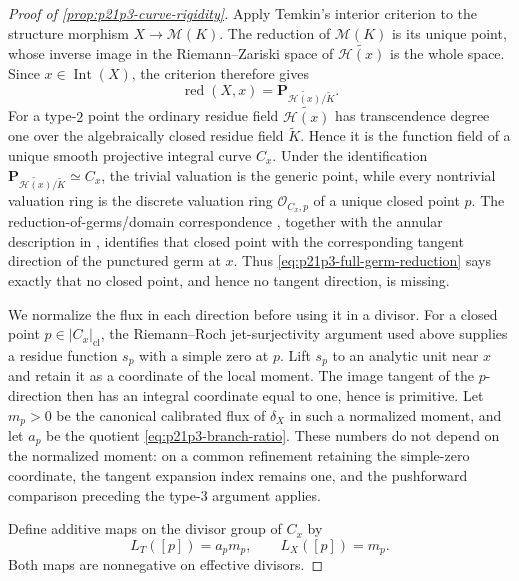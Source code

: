 \begin{proof}[Proof of \cref{prop:p21p3-curve-rigidity}]
Apply Temkin's interior criterion
\cite[Theorem~6.15]{GJR26} to the structure morphism
\(X\to\mathcal M(K)\).  The reduction of \(\mathcal M(K)\) is its
unique point, whose inverse image in the Riemann--Zariski space of
\(\widetilde{\mathcal H(x)}\) is the whole space.  Since
\(x\in\operatorname{Int}(X)\), the criterion therefore gives
\begin{equation}
\label{eq:p21p3-full-germ-reduction}
 \operatorname{red}(X,x)
   =\mathbf P_{\widetilde{\mathcal H(x)}/\widetilde K}.
\end{equation}
For a type-$2$ point the ordinary residue field
\(\widetilde{\mathcal H(x)}\) has transcendence degree one over the
algebraically closed residue field \(\widetilde K\).  Hence it is the
function field of a unique smooth projective integral curve \(C_x\).
Under the identification
\(
 \mathbf P_{\widetilde{\mathcal H(x)}/\widetilde K}\simeq C_x
\), the trivial valuation is the generic point, while every nontrivial
valuation ring is the discrete valuation ring
\(\mathcal O_{C_x,p}\) of a unique closed point \(p\).  The
reduction-of-germs/domain correspondence
\cite[\S11.8.6]{CLD25}, together with the annular description in
\cite[\S\S18.2.5--18.2.8]{CLD25}, identifies that closed point with the
corresponding tangent direction of the punctured germ at \(x\).  Thus
\eqref{eq:p21p3-full-germ-reduction} says exactly that no closed point,
and hence no tangent direction, is missing.

We normalize the flux in each direction before using it in a divisor.
For a closed point \(p\in |C_x|_{\mathrm{cl}}\), the Riemann--Roch
jet-surjectivity argument used above supplies a residue function \(s_p\)
with a simple zero at \(p\).  Lift \(s_p\) to an analytic unit near \(x\)
and retain it as a coordinate of the local moment.  The image tangent of
the \(p\)-direction then has an integral coordinate equal to one, hence is
primitive.  Let \(m_p>0\) be the canonical calibrated flux of
\(\delta_X\) in such a normalized moment, and let \(a_p\) be the quotient
\eqref{eq:p21p3-branch-ratio}.  These numbers do not depend on the
normalized moment: on a common refinement retaining the simple-zero
coordinate, the tangent expansion index remains one, and the pushforward
comparison preceding the type-$3$ argument applies.

Define additive maps on the divisor group of \(C_x\) by
\begin{equation}
\label{eq:p21p3-divisor-functionals}
 L_T([p])=a_pm_p,\qquad L_X([p])=m_p.
\end{equation}
Both maps are nonnegative on effective divisors.


\end{proof}
